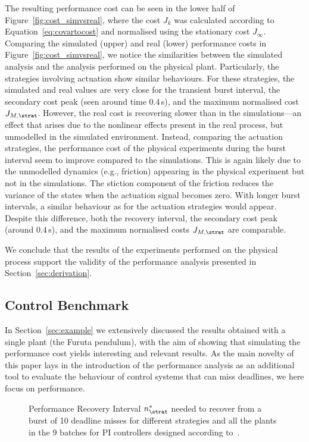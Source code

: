 The resulting performance cost can be seen in the lower half of Figure~\ref{fig:cost_simvsreal}, where the cost $J_k$ was calculated according to Equation~\eqref{eq:covartocost} and normalised using the stationary cost $J_\infty$. 
Comparing the simulated (upper) and real (lower) performance costs in Figure~\ref{fig:cost_simvsreal}, we notice the similarities between the simulated analysis and the analysis performed on the physical plant. 
%
Particularly, the strategies involving \tH{} actuation show similar behaviours. 
For these strategies, the simulated and real values are very close for the transient burst interval, the secondary cost peak (seen around time $0.4\,$s), and the maximum normalised cost $J_{M, \strat}$.
However, the real cost is recovering slower than in the simulations---an effect that arises due to the nonlinear effects present in the real process, but unmodelled in the simulated environment.
%
Instead, comparing the \tZ{} actuation strategies, the performance cost of the physical experiments during the burst interval seem to improve compared to the simulations.
This is again likely due to the unmodelled dynamics (e.g., friction) appearing in the physical experiment but not in the simulations.
The stiction component of the friction reduces the variance of the states when the actuation signal becomes zero.
With longer burst intervals, a similar behaviour as for the \tH{} actuation strategies would appear.
Despite this difference, both the recovery interval, the secondary cost peak (around $0.4\,$s), and the maximum normalised costs $J_{M,\strat}$ are comparable.

We conclude that the results of the experiments performed on the physical process support the validity of the performance analysis presented in Section~\ref{sec:derivation}.

\subsection{Control Benchmark}
\label{sec:aggregateresults}

In Section~\ref{sec:example} we extensively discussed the results obtained with a single plant (the Furuta pendulum), with the aim of showing that simulating the performance cost yields interesting and relevant results.
As the main novelty of this paper lays in the introduction of the performance analysis as an additional tool to evaluate the behaviour of control systems that can miss deadlines, we here focus on performance.

\begin{figure}[t]
    \centering
    \resizebox{0.95\textwidth}{!}{}
    \caption{Performance Recovery Interval $\recoverylengthinterval_{\strat}$ needed to recover from a burst of 10 deadline misses for different strategies and all the plants in the 9 batches for PI controllers designed according to~\cite{Garpinger:2015}.}
    \label{fig:overview10}
\end{figure}
\afterpage{\clearpage}

